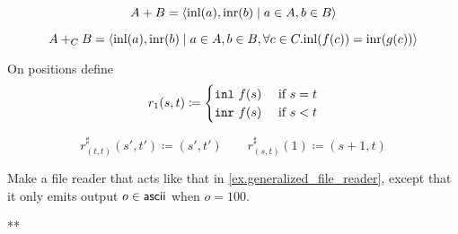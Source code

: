 \documentclass[Book-Poly]{subfiles}
\begin{document}
\begin{example}
\[A + B = \langle \mathrm{inl}(a), \mathrm{inr}(b) \mid a \in A, b \in B \rangle\]

\[A +_C B = \langle \mathrm{inl}(a), \mathrm{inr}(b) \mid a \in A, b \in B, \forall c
\in C.
\mathrm{inl}(f(c)) = \mathrm{inr}(g(c)) \rangle\]


On positions define
\[
	r_1(s,t)\coloneqq
	\begin{cases}
		\texttt{inl}\ f(s)&\textnormal{ if } s=t\\
		\texttt{inr}\ f(s)&\textnormal{ if } s<t
	\end{cases}
\]

\[
	r^\sharp_{(t,t)}(s',t')\coloneqq (s',t')
	\qquad
	r^\sharp_{(s,t)}(1)\coloneqq (s+1,t)
\]
\end{example}

\begin{exercise}
Make a file reader that acts like that in \cref{ex.generalized_file_reader}, except that it only emits output $o\in\mathsf{ascii}$ when $o=100$.
\begin{solution}
**
\end{solution}
\end{exercise}
\end{document}
